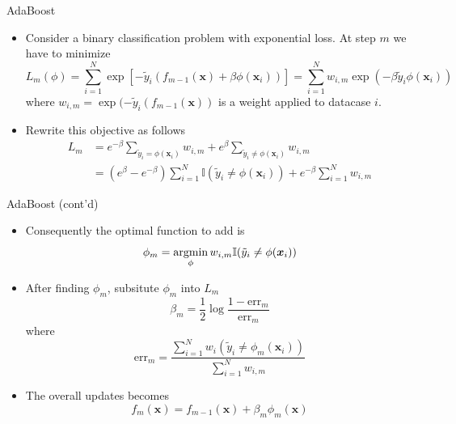 \documentclass[10pt,mathserif]{beamer}
\begin{document}
\begin{frame}{AdaBoost}
\begin{itemize}
    \item Consider a binary classification problem with exponential loss. At step $m$ we have to minimize
    \begin{equation*}
        L_m(\phi) = \sum_{i=1}^N \exp[-\tilde{y}_i(f_{m-1}(\bm{x}) + \beta\phi(\bm{x}_i))] = \sum_{i=1}^N w_{i,m}\exp(-\beta\tilde{y}_i\phi(\bm{x}_i))
    \end{equation*}
     where $w_{i,m} = \exp(-\tilde{y}_i(f_{m-1}(\bm{x}))$ is a weight applied to datacase $i$.
    \item Rewrite this objective as follows
    \begin{equation*}
        \begin{split}
            L_m & = e^{-\beta} \sum_{\tilde{y}_i = \phi(\bm{x}_i)} w_{i,m} + e^\beta \sum_{\tilde{y}_i \neq \phi(\bm{x}_i)} w_{i,m} \\
            & = (e^{\beta} - e^{-\beta} )\sum_{i=1}^N \mathbb{I}(\tilde{y}_i \neq \phi(\bm{x}_i)) + e^{-\beta}\sum_{i=1}^N w_{i,m}
        \end{split}
    \end{equation*}
\end{itemize}
\end{frame}

\begin{frame}{AdaBoost (cont'd)}
\begin{itemize}
    \item Consequently the optimal function to add is
    \begin{equation*}
        \phi_m  = \mathop{\rm argmin}_{\phi} w_{i,m} \mathbb{I}(\tilde{y}_i \neq \phi(\bm{x}_i))
    \end{equation*}
    \item After finding $\phi_m$, subsitute $\phi_m$ into $L_m$
    \begin{equation*}
        \beta_m = \frac{1}{2}\log\frac{1-\text{err}_m}{\text{err}_m}
    \end{equation*}
    where 
    \begin{equation*}
        \text{err}_m = \frac{\sum_{i=1}^N w_i \mathbb{}(\tilde{y}_i \neq \phi_m(\bm{x}_i))}{\sum_{i=1}^N w_{i,m}}
    \end{equation*}
    \item The overall updates becomes 
    \begin{equation*}
        f_m(\bm{x})= f_{m-1}(\bm{x}) + \beta_m\phi_m(\bm{x})
    \end{equation*}
\end{itemize}
\end{frame}
\end{document}
